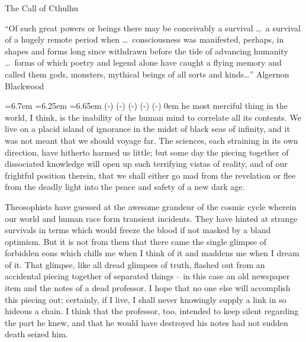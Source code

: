 


The Call of Cthulhu
\vfil\break

\beginblockquote
“Of such great powers or beings there may be conceivably a survival⁠ \dots\ a survival of a hugely remote period when⁠ \dots\ consciousness was manifested, perhaps, in shapes and forms long since withdrawn before the tide of advancing humanity⁠ \dots\ forms of which poetry and legend alone have caught a flying memory and called them gods, monsters, mythical beings of all sorts and kinds⁠\dots”\hfil\break
\null\hfill Algernon Blackwood\par
\endblockquote
\vfil\break


\newdimen\indentdimen \indentdimen=6.7em
\baselineskip
\noindent\leavevmode
{}
\baselineskip
{}=6.25em
=6.65em
	 \dimexpr(\hsize-)
	 \dimexpr(\hsize-)
	 \dimexpr(\hsize-)
	 \dimexpr(\hsize-)
	 \dimexpr(\hsize-)
	0em \hsize
\noindent
{\sc he most merciful thing} in the world, I think, is the inability of the human mind to correlate all its contents. We live on a placid island of ignorance in the midst of black seas of infinity, and it was not meant that we should voyage far. The sciences, each straining in its own direction, have hitherto harmed us little; but some day the piecing together of dissociated knowledge will open up such terrifying vistas of reality, and of our frightful position therein, that we shall either go mad from the revelation or flee from the deadly light into the peace and safety of a new dark age.

Theosophists have guessed at the awesome grandeur of the cosmic cycle wherein our world and human race form transient incidents. They have hinted at strange survivals in terms which would freeze the blood if not masked by a bland optimism. But it is not from them that there came the single glimpse of forbidden eons which chills me when I think of it and maddens me when I dream of it. That glimpse, like all dread glimpses of truth, flashed out from an accidental piecing together of separated things⁠ – in this case an old newspaper item and the notes of a dead professor. I hope that no one else will accomplish this piecing out; certainly, if I live, I shall never knowingly supply a link in so hideous a chain. I think that the professor, too, intended to keep silent regarding the part he knew, and that he would have destroyed his notes had not sudden death seized him.

